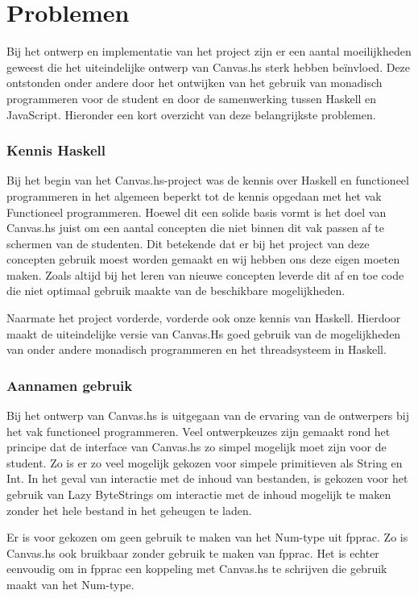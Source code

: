 \section{Problemen}

Bij het ontwerp en implementatie van het project zijn er een aantal moeilijkheden geweest die het uiteindelijke ontwerp van Canvas.hs sterk hebben beïnvloed. Deze ontstonden onder andere door het ontwijken van het gebruik van monadisch programmeren voor de student en door de samenwerking tussen Haskell en JavaScript. Hieronder een kort overzicht van deze belangrijkste problemen.

\subsubsection{Kennis Haskell}
Bij het begin van het Canvas.hs-project was de kennis over Haskell en functioneel programmeren in het algemeen beperkt tot de kennis opgedaan met het vak Functioneel programmeren. Hoewel dit een solide basis vormt is het doel van Canvas.hs juist om een aantal concepten die niet binnen dit vak passen af te schermen van de studenten. Dit betekende dat er bij het project van deze concepten gebruik moest worden gemaakt en wij hebben ons deze eigen moeten maken. Zoals altijd bij het leren van nieuwe concepten leverde dit af en toe code die niet optimaal gebruik maakte van de beschikbare mogelijkheden.

Naarmate het project vorderde, vorderde ook onze kennis van Haskell. Hierdoor maakt de uiteindelijke versie van Canvas.Hs goed gebruik van de mogelijkheden van onder andere monadisch programmeren en het threadsysteem in Haskell. 

\subsubsection{Aannamen gebruik}
Bij het ontwerp van Canvas.hs is uitgegaan van de ervaring van de ontwerpers bij het vak functioneel programmeren. Veel ontwerpkeuzes zijn gemaakt rond het principe dat de interface van Canvas.hs zo simpel mogelijk moet zijn voor de student. Zo is er zo veel mogelijk gekozen voor simpele primitieven als String en Int. In het geval van interactie met de inhoud van bestanden, is gekozen voor het gebruik van Lazy ByteStrings om interactie met de inhoud mogelijk te maken zonder het hele bestand in het geheugen te laden.

Er is voor gekozen om geen gebruik te maken van het Num-type uit fpprac. Zo is Canvas.hs ook bruikbaar zonder gebruik te maken van fpprac. Het is echter eenvoudig om in fpprac een koppeling met Canvas.hs te schrijven die gebruik maakt van het Num-type.

